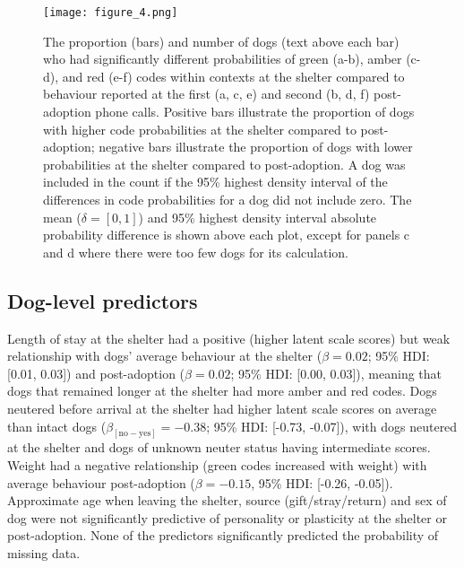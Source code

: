 \documentclass[12pt]{article}
\begin{document}
\begin{figure}[t!]
  \centering
  \texttt{[image: figure\_4.png]}
  \caption{The proportion (bars) and number of dogs (text above each bar) who had significantly different probabilities of green (a-b), amber (c-d), and red (e-f) codes within contexts at the shelter compared to behaviour reported at the first (a, c, e) and second (b, d, f) post-adoption phone calls. Positive bars illustrate the proportion of dogs with higher code probabilities at the shelter compared to post-adoption; negative bars illustrate the proportion of dogs with lower probabilities at the shelter compared to post-adoption. A dog was included in the count if the 95\% highest density interval of the differences in code probabilities for a dog did not include zero. The mean ($\delta = [0,1]$) and 95\% highest density interval absolute probability difference is shown above each plot, except for panels c and d where there were too few dogs for its calculation.}
  \label{fig_num_dogs}
\end{figure}

\subsection{Dog-level predictors}
Length of stay at the shelter had a positive (higher latent scale scores) but weak relationship with dogs' average behaviour at the shelter ($\beta = 0.02$; 95\% HDI: [0.01, 0.03]) and post-adoption ($\beta = 0.02$; 95\% HDI: [0.00, 0.03]), meaning that dogs that remained longer at the shelter had more amber and red codes. Dogs neutered before arrival at the shelter had higher latent scale scores on average than intact dogs ($\beta_{[\text{no}-\text{yes}]} = -0.38$; 95\% HDI: [-0.73, -0.07]), with dogs neutered at the shelter and dogs of unknown neuter status having intermediate scores. Weight had a negative relationship (green codes increased with weight) with average behaviour post-adoption ($\beta = -0.15$, 95\% HDI: [-0.26, -0.05]). Approximate age when leaving the shelter, source (gift/stray/return) and sex of dog were not significantly predictive of personality or plasticity at the shelter or post-adoption. None of the predictors significantly predicted the probability of missing data.
\end{document}
